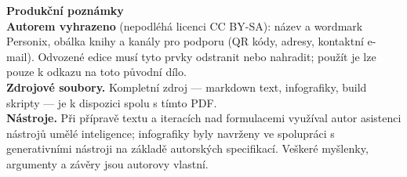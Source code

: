 \clearpage
\thispagestyle{empty}
\begin{flushleft}\small\sffamily
\textbf{Produkční poznámky}\\[1.2em]

\textbf{Autorem vyhrazeno} (nepodléhá licenci CC BY-SA): název a wordmark
Personix, obálka knihy a kanály pro podporu (QR kódy, adresy, kontaktní
e-mail). Odvozené edice musí tyto prvky odstranit nebo nahradit; použít je
lze pouze k odkazu na toto původní dílo.\\[1.2em]

\textbf{Zdrojové soubory.} Kompletní zdroj --- markdown text, infografiky,
build skripty --- je k dispozici spolu s tímto PDF.\\[1.2em]

\textbf{Nástroje.} Při přípravě textu a iteracích nad formulacemi využíval
autor asistenci nástrojů umělé inteligence; infografiky byly navrženy ve
spolupráci s generativními nástroji na základě autorských specifikací. Veškeré
myšlenky, argumenty a závěry jsou autorovy vlastní.
\end{flushleft}
\clearpage
